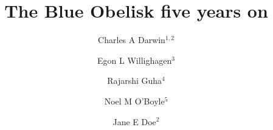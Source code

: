 \documentclass[10pt]{bmc_article}
\newenvironment{bmcformat}{\begin{raggedright}\baselineskip20pt\sloppy\setboolean{publ}{false}}{\end{raggedright}\baselineskip20pt\sloppy}
\begin{document}
\begin{bmcformat}



\title{The Blue Obelisk five years on}
 


\author{Charles A Darwin\correspondingauthor$^{1,2}$%
      \and 
         Egon L Willighagen$^3$%
     \and 
         Rajarshi Guha$^4$%
     \and 
         Noel M O'Boyle$^5$%
      \and
         Jane E Doe\correspondingauthor$^2$%
      }
      


\address{%
    \iid(1)Life Sciences Department, Kings College London, Cornwall House,%
        Waterloo Road, London, UK\\
    \iid(2)Department of Zoology, Cambridge, Waterloo Road, London, UK\\
    \iid(3)Division of Molecular Toxicology, Institute of Environmental Medicine, %
        Nobels vaeg 13, Karolinska Institutet, 171 77 Stockholm, Sweden
    \iid(5)Analytical and Biological Chemistry Research Facility, Cavanagh Pharmacy Building, University College Cork, College Road, Cork, Co. Cork, Ireland
}%

\maketitle


\end{bmcformat}
\end{document}
